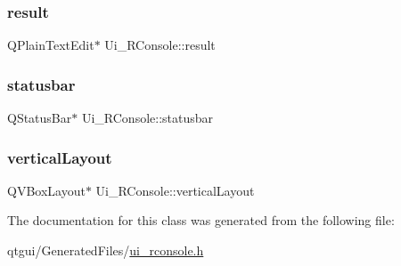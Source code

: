 \subsubsection{\texorpdfstring{result}{result}}
{\footnotesize\ttfamily Q\+Plain\+Text\+Edit$\ast$ Ui\+\_\+\+R\+Console\+::result}

\mbox{\label{class_ui___r_console_a2dd945bda0c4118eee3665e3c2f6ba92}} 
\subsubsection{\texorpdfstring{statusbar}{statusbar}}
{\footnotesize\ttfamily Q\+Status\+Bar$\ast$ Ui\+\_\+\+R\+Console\+::statusbar}

\mbox{\label{class_ui___r_console_a614984a847fea3971e7c7239557534c0}} 
\subsubsection{\texorpdfstring{verticalLayout}{verticalLayout}}
{\footnotesize\ttfamily Q\+V\+Box\+Layout$\ast$ Ui\+\_\+\+R\+Console\+::vertical\+Layout}



The documentation for this class was generated from the following file\+:\begin{DoxyCompactItemize}
\item 
qtgui/\+Generated\+Files/\mbox{\hyperlink{ui__rconsole_8h}{ui\+\_\+rconsole.\+h}}\end{DoxyCompactItemize}
